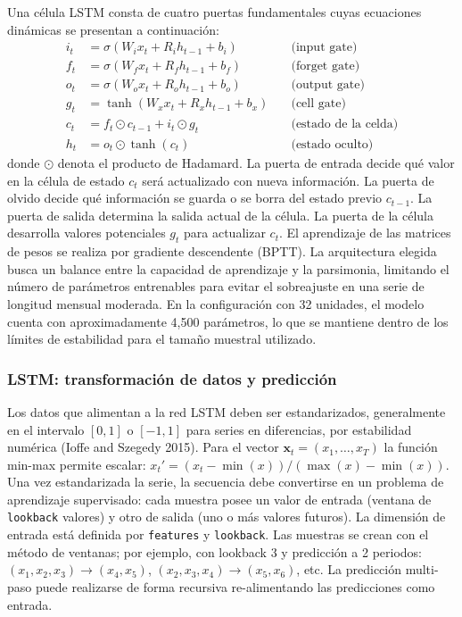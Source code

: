 \documentclass[
  12pt, a4paper, oneside]{article}
\begin{document}
Una célula LSTM consta de cuatro puertas fundamentales cuyas ecuaciones dinámicas se presentan a continuación:
\begin{align}
i_t &= \sigma(W_i x_t + R_i h_{t-1} + b_i) \quad &\text{(input gate)} \\
f_t &= \sigma(W_f x_t + R_f h_{t-1} + b_f) \quad &\text{(forget gate)} \\
o_t &= \sigma(W_o x_t + R_o h_{t-1} + b_o) \quad &\text{(output gate)} \\
g_t &= \tanh(W_x x_t + R_x h_{t-1} + b_x) \quad &\text{(cell gate)} \\
c_t &= f_t \odot c_{t-1} + i_t \odot g_t \quad &\text{(estado de la celda)} \\
h_t &= o_t \odot \tanh(c_t) \quad &\text{(estado oculto)}
\label{eq:lstm-gates}
\end{align}
donde \(\odot\) denota el producto de Hadamard.
La puerta de entrada decide qué valor en la célula de estado \(c_t\) será actualizado con nueva información. La puerta de olvido decide qué información se guarda o se borra del estado previo \(c_{t-1}\). La puerta de salida determina la salida actual de la célula. La puerta de la célula desarrolla valores potenciales \(g_t\) para actualizar \(c_t\). El aprendizaje de las matrices de pesos se realiza por gradiente descendente (BPTT). La arquitectura elegida busca un balance entre la capacidad de aprendizaje y la parsimonia, limitando el número de parámetros entrenables para evitar el sobreajuste en una serie de longitud mensual moderada. En la configuración con 32 unidades, el modelo cuenta con aproximadamente 4,500 parámetros, lo que se mantiene dentro de los límites de estabilidad para el tamaño muestral utilizado.

\subsubsection{LSTM: transformación de datos y predicción}\label{lstm-transformaciuxf3n-de-datos-y-predicciuxf3n}

Los datos que alimentan a la red LSTM deben ser estandarizados, generalmente en el intervalo \([0,1]\) o \([-1,1]\) para series en diferencias, por estabilidad numérica (Ioffe and Szegedy 2015). Para el vector \(\mathbf{x}_t = (x_1, \ldots, x_T)\) la función min-max permite escalar: \(x_t' = (x_t - \min(x))/(\max(x) - \min(x))\). Una vez estandarizada la serie, la secuencia debe convertirse en un problema de aprendizaje supervisado: cada muestra posee un valor de entrada (ventana de \texttt{lookback} valores) y otro de salida (uno o más valores futuros). La dimensión de entrada está definida por \texttt{features} y \texttt{lookback}. Las muestras se crean con el método de ventanas; por ejemplo, con lookback 3 y predicción a 2 periodos: \((x_1, x_2, x_3) \to (x_4, x_5)\), \((x_2, x_3, x_4) \to (x_5, x_6)\), etc. La predicción multi-paso puede realizarse de forma recursiva re-alimentando las predicciones como entrada.
\end{document}
